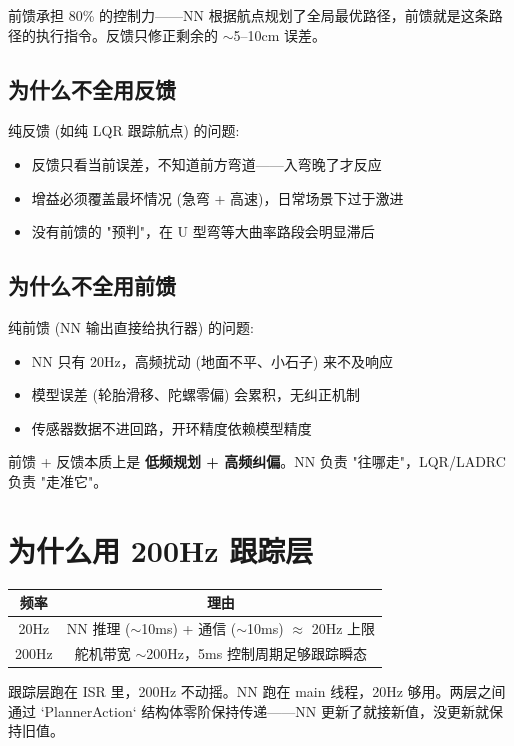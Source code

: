 \documentclass[11pt,a4paper]{article}
\begin{document}
前馈承担 80\% 的控制力——NN 根据航点规划了全局最优路径，前馈就是这条路径的执行指令。反馈只修正剩余的 $\sim$5--10cm 误差。

\subsection{为什么不全用反馈}

纯反馈 (如纯 LQR 跟踪航点) 的问题:
\begin{itemize}
\item 反馈只看当前误差，不知道前方弯道——入弯晚了才反应
\item 增益必须覆盖最坏情况 (急弯 + 高速)，日常场景下过于激进
\item 没有前馈的 "预判"，在 U 型弯等大曲率路段会明显滞后
\end{itemize}

\subsection{为什么不全用前馈}

纯前馈 (NN 输出直接给执行器) 的问题:
\begin{itemize}
\item NN 只有 20Hz，高频扰动 (地面不平、小石子) 来不及响应
\item 模型误差 (轮胎滑移、陀螺零偏) 会累积，无纠正机制
\item 传感器数据不进回路，开环精度依赖模型精度
\end{itemize}

前馈 + 反馈本质上是 \textbf{低频规划 + 高频纠偏}。NN 负责 "往哪走"，LQR/LADRC 负责 "走准它"。

\section{为什么用 200Hz 跟踪层}

\begin{center}
\begin{tabular}{c|c}
\toprule
频率 & 理由 \\
\midrule
20Hz  & NN 推理 ($\sim$10ms) + 通信 ($\sim$10ms) $\approx$ 20Hz 上限 \\
200Hz & 舵机带宽 $\sim$200Hz，5ms 控制周期足够跟踪瞬态 \\
\bottomrule
\end{tabular}
\end{center}

跟踪层跑在 ISR 里，200Hz 不动摇。NN 跑在 main 线程，20Hz 够用。两层之间通过 `PlannerAction` 结构体零阶保持传递——NN 更新了就接新值，没更新就保持旧值。
\end{document}
